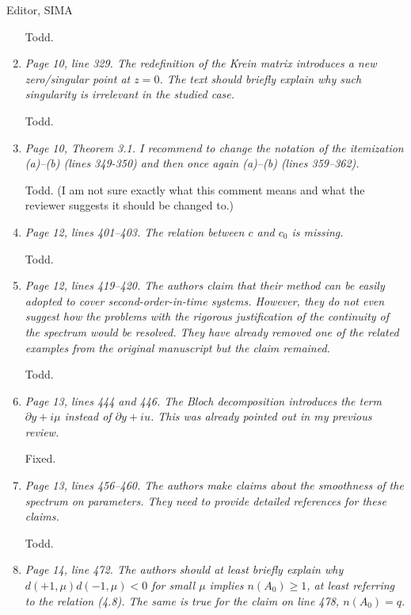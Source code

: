 \documentclass[11pt]{letter}
\begin{document}
\begin{letter}{Editor, SIMA}
\begin{enumerate}
Todd.

\item \emph{Page 10, line 329. The redefinition of the Krein matrix introduces a new zero/singular point at $z = 0$. The text should briefly explain why such singularity is irrelevant in the studied case.}
\vspace{4mm}

Todd.

\item \emph{Page 10, Theorem 3.1. I recommend to change the notation of the itemization (a)–(b) (lines 349-350) and then once again (a)–(b) (lines 359–362).}
\vspace{4mm}

Todd. (I am not sure exactly what this comment means and what the reviewer suggests it should be changed to.)

\item \emph{Page 12, lines 401–403. The relation between $c$ and $c_0$ is missing.}
\vspace{4mm}

Todd.

\item \emph{Page 12, lines 419–420. The authors claim that their method can be easily adopted to cover second-order-in-time systems. However, they do not even suggest how the problems with the rigorous justification of the continuity of the spectrum would be resolved. They have already removed one of the related examples from the original manuscript but the claim remained.}
\vspace{4mm}

Todd.

\item \emph{Page 13, lines 444 and 446. The Bloch decomposition introduces the term $\partial y + i \mu$ instead of $\partial y + i u$. This was already pointed out in my previous review.}
\vspace{4mm}

Fixed.

\item \emph{Page 13, lines 456–460. The authors make claims about the smoothness of the spectrum on parameters. They need to provide detailed references for these claims.}
\vspace{4mm}

Todd.

\item \emph{Page 14, line 472. The authors should at least briefly explain why $d(+1,\mu)d(-1,\mu) < 0$ for small $\mu$ implies $n(A_0) \geq 1$, at least referring to the relation (4.8). The same is true for the claim on line 478, $n(A_0) = q$.}
\vspace{4mm}


\end{enumerate}
\end{letter}
\end{document}
